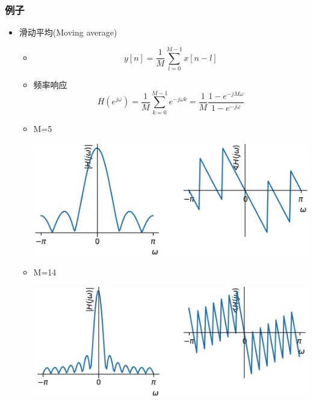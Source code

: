 \documentclass[CJKutf8,xcolor=pdftex,dvipsnames,table]{beamer}
\begin{document}
\begin{CJK*}{UTF8}{song}
  \begin{frame}
    \frametitle{例子}
    \begin{itemize}
    \item 滑动平均(Moving average)
    	\begin{itemize}
		\item \[ y[n]=\frac{1}{M}\sum_{l=0}^{M-1}x[n-l] \]
		\item 频率响应 \[ H(e^{j\omega})=\frac{1}{M}\sum_{k=0}^{M-1}e^{-j\omega k} = \frac{1}{M}\frac{1-e^{-jM\omega}}{1-e^{-j\omega}} \]
		\item M=5
    \begin{center}
      \includegraphics[scale=.29]{freqrespavg5}
    \end{center}
    	\item M=14
    \begin{center}
      \includegraphics[scale=.29]{freqrespavg14}
    \end{center}
	
		\end{itemize}
    \end{itemize}
  \end{frame}  
   

\end{CJK*}
\end{document}
